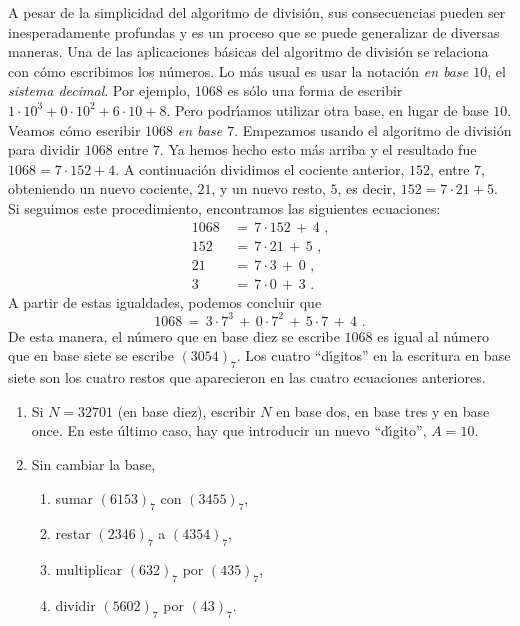 A pesar de la simplicidad del algoritmo de divisi\'on, sus consecuencias
pueden ser inesperadamente profundas y es un proceso que se puede
generalizar de diversas maneras. Una de las aplicaciones b\'asicas
del algoritmo de divisi\'on se relaciona con c\'omo escribimos los
n\'umeros. Lo m\'as usual es usar la notaci\'on \emph{en base $10$},
el \emph{sistema decimal}. Por ejemplo, $1068$ es s\'olo una forma de
escribir $1\cdot 10^3+0\cdot 10^2+6\cdot 10+8$. Pero podr\'{\i}amos
utilizar otra base, en lugar de base $10$.
Veamos c\'omo escribir $1068$ \emph{en base $7$}.
Empezamos usando el algoritmo de divisi\'on para dividir $1068$ entre $7$.
Ya hemos hecho esto m\'as arriba y el resultado fue $1068=7\cdot 152+4$.
A continuaci\'on dividimos el cociente anterior, $152$, entre $7$,
obteniendo un nuevo cociente, $21$, y un nuevo resto, $5$, es decir,
$152=7\cdot 21+5$. Si seguimos este procedimiento, encontramos las
siguientes ecuaciones:
\begin{displaymath}
	\begin{aligned}
		1068 & \,=\,7\cdot 152\,+\,4
			\text{ ,} \\
		152 & \,=\,7\cdot 21\,+\,5
			\text{ ,} \\
		21 & \,=\,7\cdot 3\,+\,0
			\text{ ,} \\
		3 & \,=\,7\cdot 0\,+\, 3
			\text{ .}
	\end{aligned}
\end{displaymath}
%
A partir de estas igualdades, podemos concluir que
\begin{displaymath}
	1068\,=\,3\cdot 7^3\,+\,0\cdot 7^2\,+\,5\cdot 7\,+\,4
	\text{ .}
\end{displaymath}
%
De esta manera, el n\'umero que en base diez se escribe
$1068$ es igual al n\'umero que en base siete se escribe
$(3054)_7$. Los cuatro ``d\'{\i}gitos'' en la escritura en base siete
son los cuatro restos que aparecieron en las cuatro ecuaciones anteriores.

\begin{enumerate}[label=P\arabic*]
	\item\label{item:cambiar}
		Si $N=32701$ (en base diez), escribir $N$ en base dos,
		en base tres y en base once. En este \'ultimo caso,
		hay que introducir un nuevo ``d\'{\i}gito'', $A=10$.
	\item\label{item:operar}
		Sin cambiar la base,
		\begin{enumerate}[label=(\alph*)]
			\item\label{item:operar:sumar}
				sumar $(6153)_7$ con $(3455)_7$,
			\item\label{item:operar:restar}
				restar $(2346)_7$ a $(4354)_7$,
			\item\label{item:operar:multiplicar}
				multiplicar $(632)_7$ por $(435)_7$,
			\item\label{item:operar:dividir}
				dividir $(5602)_7$ por $(43)_7$.
		\end{enumerate}
	\seti
\end{enumerate}
%


